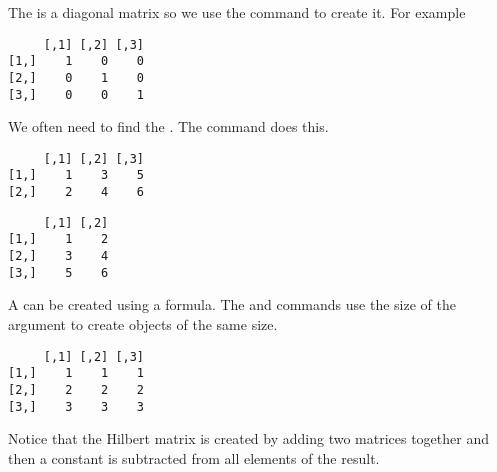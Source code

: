 The  is a diagonal matrix so we use the  command to create it. For example 
\begin{knitrout}
\color{fgcolor}\begin{kframe}
\begin{alltt}
\hlstd{> }\hlkwb{=}\hlstd{(}\hlstd{)}
\hlstd{> }
\end{alltt}
\begin{verbatim}
     [,1] [,2] [,3]
[1,]    1    0    0
[2,]    0    1    0
[3,]    0    0    1
\end{verbatim}
\end{kframe}
\end{knitrout}
 
We often need to find the . The  command does this. 
\begin{knitrout}
\color{fgcolor}\begin{kframe}
\begin{alltt}
\hlstd{> }\hlkwb{=}\hlstd{(}\hlopt{:}\hlstd{,}\hlstd{=}\hlstd{)}
\hlstd{> }
\end{alltt}
\begin{verbatim}
     [,1] [,2] [,3]
[1,]    1    3    5
[2,]    2    4    6
\end{verbatim}
\begin{alltt}
\hlstd{> }
\end{alltt}
\begin{verbatim}
     [,1] [,2]
[1,]    1    2
[2,]    3    4
[3,]    5    6
\end{verbatim}
\end{kframe}
\end{knitrout}
 
A  can be created using a formula. The  and  commands use the size of the argument to create objects of the same size. 
\begin{knitrout}
\color{fgcolor}\begin{kframe}
\begin{alltt}
\hlstd{> }
\end{alltt}
\begin{verbatim}
     [,1] [,2] [,3]
[1,]    1    1    1
[2,]    2    2    2
[3,]    3    3    3
\end{verbatim}
\begin{alltt}
\hlstd{> }\hlkwb{=}\hlopt{+}\hlopt{-}
\end{alltt}
\end{kframe}
\end{knitrout}
Notice that the Hilbert matrix is created by adding two matrices together and then a constant is subtracted from all elements of the result. 
 
